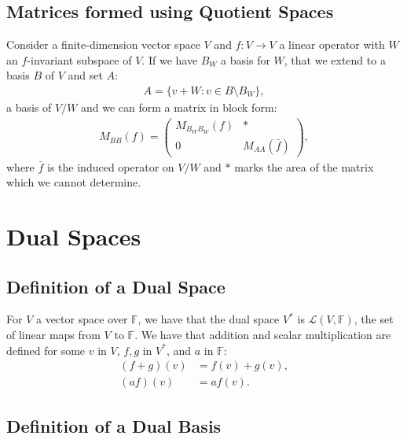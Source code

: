 \documentclass[a4paper, 12pt, twoside]{article}
\begin{document}
\newpage

\subsection{Matrices formed using Quotient Spaces}

Consider a finite-dimension vector space $V$ and $f : V \to V$ a linear
operator with $W$ an $f$-invariant subspace of $V$. 
If we have $B_W$ a basis for $W$, that we extend to a basis $B$ of 
$V$ and set $A$: \begin{gather*}
  A = \{v + W : v \in B \setminus B_W \},
\end{gather*} a basis of $V/W$ and we can form
a matrix in block form: \begin{gather*}
  M_{BB}(f) = \begin{pmatrix}
    M_{B_WB_W}(f) & * \\
    0 & M_{AA}(\bar{f})
  \end{pmatrix},
\end{gather*} where $\bar{f}$ is the induced operator on $V/W$ and $*$
marks the area of the matrix which we cannot determine.

\section{Dual Spaces}

\subsection{Definition of a Dual Space}

For $V$ a vector space over $\mathbb{F}$, we have that the dual space
$V^*$ is $\mathcal{L}(V, \mathbb{F})$, the set of linear maps from 
$V$ to $\mathbb{F}$. We have that addition and scalar multiplication
are defined for some $v$ in $V$, $f, g$ in $V^*$, and $a$ in 
$\mathbb{F}$: \begin{align*}
  (f + g)(v) &= f(v) + g(v), \\
  (af)(v) &= af(v).
\end{align*}

\subsection{Definition of a Dual Basis}
\end{document}
